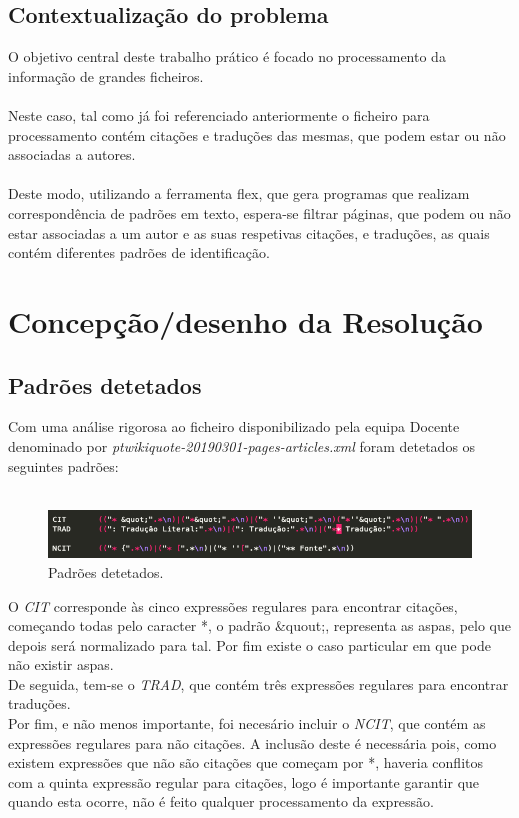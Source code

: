 \documentclass[11pt,a4paper]{report}%
\begin{document}
\section{Contextualização do problema} \label{sec:descricaoProblema} %
O objetivo central deste trabalho prático é focado no processamento da informação de grandes ficheiros.\\\\Neste caso, tal como já foi referenciado anteriormente o ficheiro para processamento contém citações e traduções das mesmas, que podem estar ou não associadas a autores.\\\\Deste modo, utilizando a ferramenta flex, que gera programas que realizam correspondência de padrões em texto, espera-se filtrar páginas, que podem ou não estar associadas a um autor e as suas respetivas citações, e traduções, as quais contém diferentes padrões de identificação.


\chapter{Concepção/desenho da Resolução}

\section{Padrões detetados}
Com uma análise rigorosa ao ficheiro disponibilizado pela equipa Docente denominado por \emph{ptwikiquote-20190301-pages-articles.xml} foram detetados os seguintes padrões:\\\\

\begin{figure}[ht]
	\centering
	\includegraphics[scale=0.6]{er.png}
	\caption{Padrões detetados.}
	\label{img:cit}
\end{figure}


O \emph{CIT} corresponde às cinco expressões regulares para encontrar citações, começando todas pelo caracter *, o padrão \&quout;, representa as aspas, pelo que depois será normalizado para tal. Por fim existe o caso particular em que pode não existir aspas. \\De seguida, tem-se o \emph{TRAD}, que contém três expressões regulares para encontrar traduções. 
\\Por fim, e não menos importante, foi necesário incluir o \emph{NCIT}, que contém as expressões regulares para não citações. A inclusão deste é necessária pois, como existem expressões que não são citações que começam por *, haveria conflitos com a quinta expressão regular para citações, logo é importante garantir que quando esta ocorre, não é feito qualquer processamento da expressão.
\end{document}
